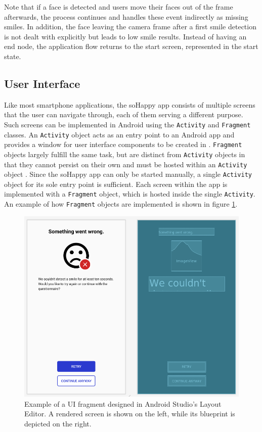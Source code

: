Note that if a face is detected and users move their faces out of the frame afterwards, the process continues and handles these event indirectly as missing smiles.
In addition, the face leaving the camera frame after a first smile detection is not dealt with explicitly but leads to low smile results.
Instead of having an end node, the application flow returns to the start screen, represented in the start state.

\subsection{User Interface} \label{sec:user_interface}
Like most smartphone applications, the soHappy app consists of multiple screens that the user can navigate through, each of them serving a different purpose. Such screens can be implemented in Android using the \texttt{Activity} and \texttt{Fragment} classes. An \texttt{Activity} object acts as an entry point to an Android app and provides a window for user interface components to be created in \cite{intro_to_activities}. \texttt{Fragment} objects largely fulfill the same task, but are distinct from \texttt{Activity} objects in that they cannot persist on their own and must be hosted within an \texttt{Activity} object \cite{intro_to_fragments}. Since the soHappy app can only be started manually, a single \texttt{Activity} object for its sole entry point is sufficient. Each screen within the app is implemented with a \texttt{Fragment} object, which is hosted inside the single \texttt{Activity}. An example of how \texttt{Fragment} objects are implemented is shown in figure \ref{fig:user_interface}.

\begin{figure}
  \includegraphics[width=\linewidth]{figures/user_interface.png}
  \caption{Example of a UI fragment designed in Android Studio's Layout Editor. A rendered screen is shown on the left, while its blueprint is depicted on the right.}
  \label{fig:user_interface}
\end{figure}

